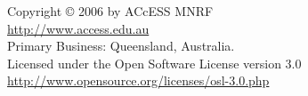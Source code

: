 
\begin{center}
           Copyright © 2006 by ACcESS MNRF \\
               \url{http://www.access.edu.au} \\
         Primary Business: Queensland, Australia. \\
   Licensed under the Open Software License version 3.0 \\
      \url{http://www.opensource.org/licenses/osl-3.0.php} \\
\end{center}
